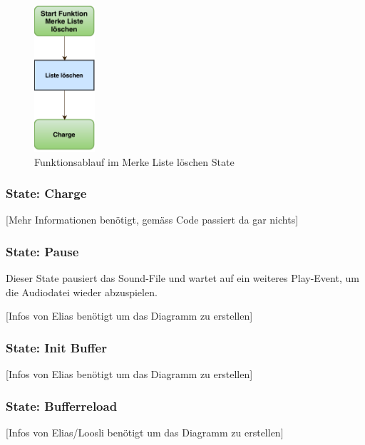 \begin{figure}[htbp!!!!]
	\centering
	\includegraphics[width=0.2\textwidth]{Data/MerkeListeLoeschen_picture.pdf}
	\caption[Statemachine: Merke Liste löschen]{Funktionsablauf im Merke Liste löschen State}
	\label{fig:merkeListeLoeschenState}
\end{figure} 

\subsubsection*{State: Charge}

[Mehr Informationen benötigt, gemäss Code passiert da gar nichts]

\subsubsection*{State: Pause}

Dieser State pausiert das Sound-File und wartet auf ein weiteres Play-Event, um die Audiodatei wieder abzuspielen.

[Infos von Elias benötigt um das Diagramm zu erstellen]

\subsubsection*{State: Init Buffer}

[Infos von Elias benötigt um das Diagramm zu erstellen]

\subsubsection*{State: Bufferreload}

[Infos von Elias/Loosli benötigt um das Diagramm zu erstellen]